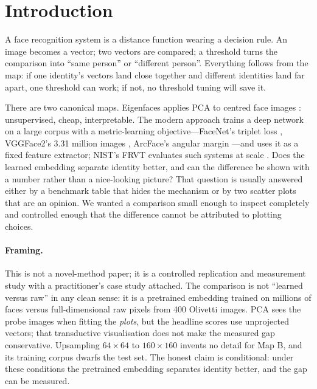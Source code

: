 \section{Introduction}\label{sec:intro}

A face recognition system is a distance function wearing a decision rule. An image becomes a vector; two vectors are compared; a threshold turns the comparison into ``same person'' or ``different person''. Everything follows from the map: if one identity's vectors land close together and different identities land far apart, one threshold can work; if not, no threshold tuning will save it.

There are two canonical maps. Eigenfaces applies PCA to centred face images \citep{turk1991}: unsupervised, cheap, interpretable. The modern approach trains a deep network on a large corpus with a metric-learning objective---FaceNet's triplet loss \citep{schroff2015}, VGGFace2's 3.31 million images \citep{cao2018}, ArcFace's angular margin \citep{deng2019}---and uses it as a fixed feature extractor; NIST's FRVT evaluates such systems at scale \citep{grother2019}. Does the learned embedding separate identity better, and can the difference be shown with a number rather than a nice-looking picture? That question is usually answered either by a benchmark table that hides the mechanism or by two scatter plots that are an opinion. We wanted a comparison small enough to inspect completely and controlled enough that the difference cannot be attributed to plotting choices.

\paragraph{Framing.} This is not a novel-method paper; it is a controlled replication and measurement study with a practitioner's case study attached. The comparison is not ``learned versus raw'' in any clean sense: it is a pretrained embedding trained on millions of faces versus full-dimensional raw pixels from 400 Olivetti images. PCA sees the probe images when fitting the \emph{plots}, but the headline scores use unprojected vectors; that transductive visualisation does not make the measured gap conservative. Upsampling $64\times64$ to $160\times160$ invents no detail for Map B, and its training corpus dwarfs the test set. The honest claim is conditional: under these conditions the pretrained embedding separates identity better, and the gap can be measured.


